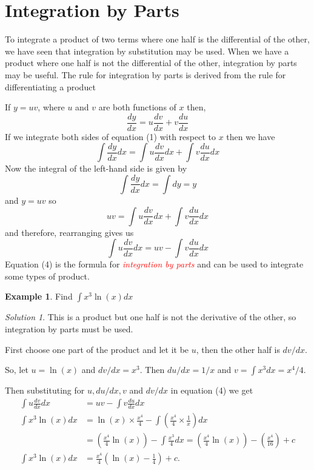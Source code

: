 \documentclass[
  11pt,
  oneside]{book}
\newcommand{\slide}{}
\theoremstyle{definition}
\theoremstyle{definition}
\newtheorem{example}{Example}[chapter]
\theoremstyle{definition}
\theoremstyle{definition}
\theoremstyle{remark}
\newtheorem*{solution}{Solution}
\begin{document}
\slide

\section{Integration by Parts}\label{integration-by-parts}

To integrate a product of two terms where one half is the differential of the other, we have seen that integration by substitution may be used. When we have a product where one half is not the differential of the other, integration by parts may be useful. The rule for integration by parts is derived from the rule for differentiating a product

If \(y = uv\), where \(u\) and \(v\) are both functions of \(x\) then,
\[
\frac{dy}{dx} = u\frac{dv}{dx} + v\frac{du}{dx}\tag{1}
\]
If we integrate both sides of equation (1) with respect to \(x\) then we have
\[
\int\frac{dy}{dx}dx = \int u\frac{dv}{dx}dx + \int v\frac{du}{dx}dx\tag{2}
\]
Now the integral of the left-hand side is given by
\[
\int\frac{dy}{dx}dx = \int dy = y
\]
and \(y = uv\) so
\[
uv =\int u\frac{dv}{dx}dx +\int v\frac{du}{dx}dx\tag{3}
\]
and therefore, rearranging gives us
\[
\int u\frac{dv}{dx}dx = uv -\int v\frac{du}{dx}dx\tag{4}
\]
Equation (4) is the formula for \textcolor{red}{\em integration by parts} and can be used to integrate some types of
product.

\slide

\begin{example}
Find \(\displaystyle\int x^3\ln(x)dx\)
\end{example}

\begin{solution}
This is a product but one half is not the derivative of the other, so integration by parts must be used.

First choose one part of the product and let it be \(u\), then the other half is \(dv/dx\).

So, let \(u = \ln(x)\) and \(dv/dx = x^3\). Then \(du/dx = 1/x\) and \(v=\displaystyle\int x^3dx = x^4/4\).

Then substituting for \(u, du/dx, v\) and \(dv/dx\) in equation (4) we get
\begin{align*}
\int u\frac{dv}{dx}dx& = uv-\int v\frac{du}{dx}dx\\
\int x^3\ln(x)dx& = \ln(x)\times \frac{x^4}{4} - \int\left(\frac{x^4}{4}\times\frac{1}{x}\right)dx\\
&=\left(\frac{x^4}{4}\ln(x)\right)-\int\frac{x^3}{4}dx = \left(\frac{x^4}{4}\ln(x)\right) - \left(\frac{x^4}{16}\right)+c\\
\int x^3\ln(x)dx& = \frac{x^4}{4}\left(\ln(x)-\frac14\right)+c.
\end{align*}
\end{solution}
\end{document}
